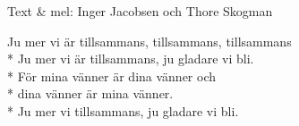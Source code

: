 \begin{SongText}
    \begin{SongInfo}
        Text \& mel: Inger Jacobsen och Thore Skogman
    \end{SongInfo}
    \begin{SongVerse}
        Ju mer vi är tillsammans, tillsammans, tillsammans\\*%
        Ju mer vi är tillsammans, ju gladare vi bli.\\*%
        För mina vänner är dina vänner och\\*%
        dina vänner är mina vänner.\\*%
        Ju mer vi tillsammans, ju gladare vi bli.
    \end{SongVerse}
\end{SongText}
